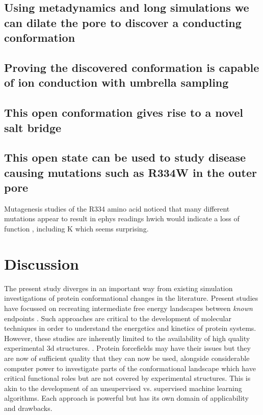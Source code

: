\subsection{Using metadynamics and long simulations we can dilate the pore to discover a conducting conformation}

\subsection{Proving the discovered conformation is capable of ion conduction with umbrella sampling}

\subsection{This open conformation gives rise to a novel salt bridge}
\label{salt_bridge}

\subsection{This open state can be used to study disease causing mutations such as R334W in the outer pore}
Mutagenesis studies of the R334 amino acid noticed that many different mutations appear to result in ephys readings hwich would indicate a loss of function \cite{gong2004}, including K which seems surprising.

\section{Discussion}

The present study diverges in an important way from existing simulation investigations of protein conformational changes in the literature. Present studies have focussed on recreating intermediate free energy landscapes between \textit{known} endpoints \cite{lev2020, bergh2021}. Such approaches are critical to the development of molecular techniques in order to understand the energetics and kinetics of protein systems. However, these studies are inherently limited to the availability of high quality experimental 3d structures. . Protein forcefields may have their issues but they are now of sufficient quality that they can now be used, alongside considerable computer power to investigate parts of the conformational landscape which have critical functional roles but are not covered by experimental structures. This is akin to the development of an unsupervised vs. supervised machine learning algorithms. Each approach is powerful but has its own domain of applicability and drawbacks. 

